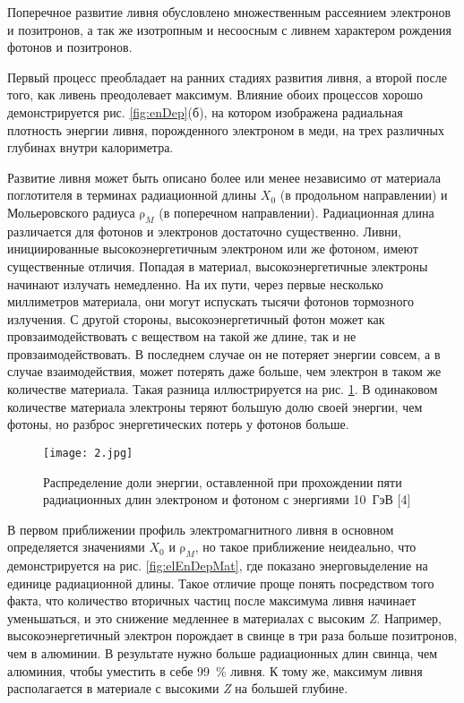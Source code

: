 Поперечное развитие ливня обусловлено множественным рассеянием электронов и позитронов, а так же изотропным и несоосным с ливнем характером рождения фотонов и позитронов.

Первый процесс преобладает на ранних стадиях развития ливня, а второй после того, как ливень преодолевает максимум. Влияние обоих процессов хорошо демонстрируется рис.  \ref{fig:enDep}(б), на котором изображена радиальная плотность энергии ливня, порожденного электроном в меди, на трех различных глубинах внутри калориметра.

Развитие ливня может быть описано более или менее независимо от материала поглотителя в терминах радиационной длины $X_0$ (в продольном направлении) и Мольеровского радиуса $\mathrm{\rho}_M$ (в поперечном направлении). Радиационная длина различается для фотонов и электронов достаточно существенно. Ливни, инициированные высокоэнергетичным  электроном или же фотоном, имеют существенные отличия. Попадая  в материал, высокоэнергетичные электроны начинают излучать немедленно. На их пути, через первые несколько миллиметров материала, они могут испускать тысячи фотонов тормозного излучения. С другой стороны, высокоэнергетичный фотон может как провзаимодействовать с веществом на такой же длине, так и не провзаимодействовать.  В последнем случае он не потеряет энергии совсем, а в случае взаимодействия, может потерять даже больше, чем электрон в таком же количестве материала. Такая разница иллюстрируется на рис. \ref{fig:gamAndEnFraq}. В одинаковом количестве материала электроны теряют большую долю своей энергии, чем фотоны, но разброс энергетических потерь у фотонов больше.

\begin{figure}[H]
    \centering
    \texttt{[image: 2.jpg]}
    \caption{Распределение доли энергии, оставленной при прохождении пяти радиационных длин электроном и фотоном с энергиями \mbox{10 ГэВ} [4]}
    \label{fig:gamAndEnFraq}
\end{figure}

В первом приближении профиль электромагнитного ливня в основном определяется значениями $X_0$ и $\mathrm{\rho}_M$,  но  такое  приближение неидеально,  что демонстрируется на рис. \ref{fig:elEnDepMat},  где  показано  энерговыделение  на  единице радиационной длины. Такое отличие проще понять посредством того факта, что количество  вторичных  частиц  после  максимума  ливня  начинает уменьшаться,  и  это  снижение  медленнее  в  материалах с высоким {\textit Z}. Например,  высокоэнергетичный  электрон  порождает  в  свинце  в  три  раза больше  позитронов,  чем  в  алюминии.  В  результате  нужно  больше радиационных  длин  свинца,  чем  алюминия,  чтобы  уместить  в  себе  \mbox{99  \%} ливня. К тому же, максимум ливня располагается в материале с высокими {\textit Z} на большей глубине.

